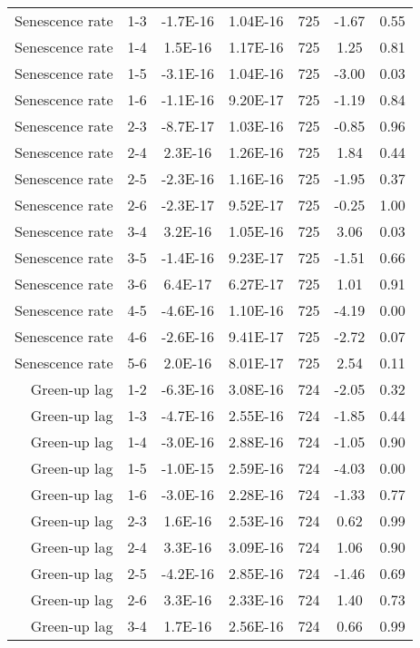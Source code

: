 \begin{table}[H]
\begin{tabular}{rcccccc}
  Senescence rate & 1-3 & -1.7E-16 & 1.04E-16 & 725 & -1.67 & 0.55 \\ 
  Senescence rate & 1-4 & 1.5E-16 & 1.17E-16 & 725 & 1.25 & 0.81 \\ 
  Senescence rate & 1-5 & -3.1E-16 & 1.04E-16 & 725 & -3.00 & 0.03 \\ 
  Senescence rate & 1-6 & -1.1E-16 & 9.20E-17 & 725 & -1.19 & 0.84 \\ 
  Senescence rate & 2-3 & -8.7E-17 & 1.03E-16 & 725 & -0.85 & 0.96 \\ 
  Senescence rate & 2-4 & 2.3E-16 & 1.26E-16 & 725 & 1.84 & 0.44 \\ 
  Senescence rate & 2-5 & -2.3E-16 & 1.16E-16 & 725 & -1.95 & 0.37 \\ 
  Senescence rate & 2-6 & -2.3E-17 & 9.52E-17 & 725 & -0.25 & 1.00 \\ 
  Senescence rate & 3-4 & 3.2E-16 & 1.05E-16 & 725 & 3.06 & 0.03 \\ 
  Senescence rate & 3-5 & -1.4E-16 & 9.23E-17 & 725 & -1.51 & 0.66 \\ 
  Senescence rate & 3-6 & 6.4E-17 & 6.27E-17 & 725 & 1.01 & 0.91 \\ 
  Senescence rate & 4-5 & -4.6E-16 & 1.10E-16 & 725 & -4.19 & 0.00 \\ 
  Senescence rate & 4-6 & -2.6E-16 & 9.41E-17 & 725 & -2.72 & 0.07 \\ 
  Senescence rate & 5-6 & 2.0E-16 & 8.01E-17 & 725 & 2.54 & 0.11 \\ 
  Green-up lag & 1-2 & -6.3E-16 & 3.08E-16 & 724 & -2.05 & 0.32 \\ 
  Green-up lag & 1-3 & -4.7E-16 & 2.55E-16 & 724 & -1.85 & 0.44 \\ 
  Green-up lag & 1-4 & -3.0E-16 & 2.88E-16 & 724 & -1.05 & 0.90 \\ 
  Green-up lag & 1-5 & -1.0E-15 & 2.59E-16 & 724 & -4.03 & 0.00 \\ 
  Green-up lag & 1-6 & -3.0E-16 & 2.28E-16 & 724 & -1.33 & 0.77 \\ 
  Green-up lag & 2-3 & 1.6E-16 & 2.53E-16 & 724 & 0.62 & 0.99 \\ 
  Green-up lag & 2-4 & 3.3E-16 & 3.09E-16 & 724 & 1.06 & 0.90 \\ 
  Green-up lag & 2-5 & -4.2E-16 & 2.85E-16 & 724 & -1.46 & 0.69 \\ 
  Green-up lag & 2-6 & 3.3E-16 & 2.33E-16 & 724 & 1.40 & 0.73 \\ 
  Green-up lag & 3-4 & 1.7E-16 & 2.56E-16 & 724 & 0.66 & 0.99 \\ 

\end{tabular}
\end{table}
